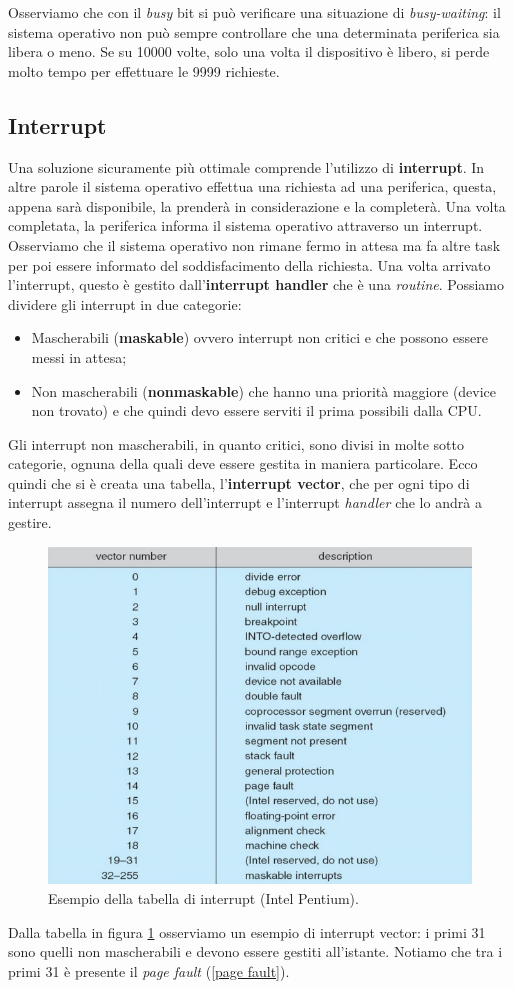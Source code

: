 Osserviamo che con il \textit{busy} bit si può verificare una situazione di \textit{busy-waiting}: il sistema operativo non può sempre controllare che una determinata periferica sia libera o meno. Se su 10000 volte, solo una volta il dispositivo è libero, si perde molto tempo per effettuare le 9999 richieste.

% 
\subsection{Interrupt}\label{interrupt handler}
Una soluzione sicuramente più ottimale comprende l'utilizzo di \textbf{interrupt}. In altre parole il sistema operativo effettua una richiesta ad una periferica, questa, appena sarà disponibile, la prenderà in considerazione e la completerà. Una volta completata, la periferica informa il sistema operativo attraverso un interrupt. Osserviamo che il sistema operativo non rimane fermo in attesa ma fa altre task per poi essere informato del soddisfacimento della richiesta. Una volta arrivato l'interrupt, questo è gestito dall'\textbf{interrupt handler} che è una \textit{routine}. Possiamo dividere gli interrupt in due categorie:
\vspace{-5px}
\begin{itemize}
\setlength{\itemsep}{-.15 em}
    \item Mascherabili (\textbf{maskable}) ovvero interrupt non critici e che possono essere messi in attesa;
    \item Non mascherabili (\textbf{nonmaskable}) che hanno una priorità maggiore (device non trovato) e che quindi devo essere serviti il prima possibili dalla CPU.
\end{itemize}

Gli interrupt non mascherabili, in quanto critici, sono divisi in molte sotto categorie, ognuna della quali deve essere gestita in maniera particolare. Ecco quindi che si è creata una tabella, l'\textbf{interrupt vector}, che per ogni tipo di interrupt assegna il numero dell'interrupt e l'interrupt \textit{handler} che lo andrà a gestire.
\begin{figure}[h]
    \centering
    \includegraphics[width = .6\textwidth]{../res/imgs/IO system/interrupt_vector.png}
    \caption{Esempio della tabella di interrupt (Intel Pentium).}
    \label{fig:interruptVector}
\end{figure}
Dalla tabella in figura \ref{fig:interruptVector} osserviamo un esempio di interrupt vector: i primi 31 sono quelli non mascherabili e devono essere gestiti all'istante. Notiamo che tra i primi 31 è presente il \textit{page fault }(\ref{page fault}).

